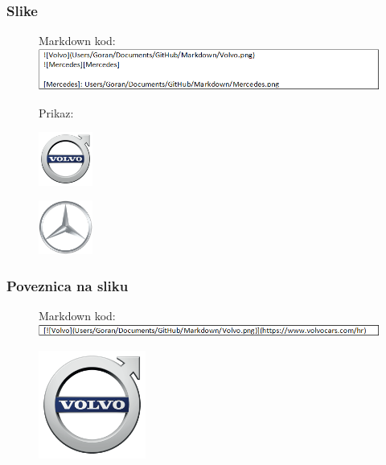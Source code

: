 \documentclass{beamer}
\begin{document}
\newpage

\begin{frame}
\frametitle{Slike}
\begin{figure}
{Markdown kod:} 
\includegraphics[width = 1.0\linewidth]{Slike.png}
\end{figure}

\begin{figure}
\begin{center}
{Prikaz:}
\end{center}
\begin{flushleft}
\begin{center}
\includegraphics[width = 50pt]{Volvo.png}
\end{center}
\end{flushleft}
\end{figure}

\begin{figure} 
\begin{flushleft}

\begin{center}
\includegraphics[width = 50pt]{Mercedes.png}
\end{center}
\end{flushleft}
\end{figure}

\end{frame}

\newpage

\begin{frame}
\frametitle{Poveznica na sliku}
\begin{figure}
{Markdown kod:}
\includegraphics[width = 1.0\linewidth]{Poveznica_na_sliku.png}
\end{figure}

\begin{figure}
\href{https://www.volvocars.com/hr}{\includegraphics[width = 100pt]{Volvo.png}}
\end{figure}
\end{frame}
\end{document}
